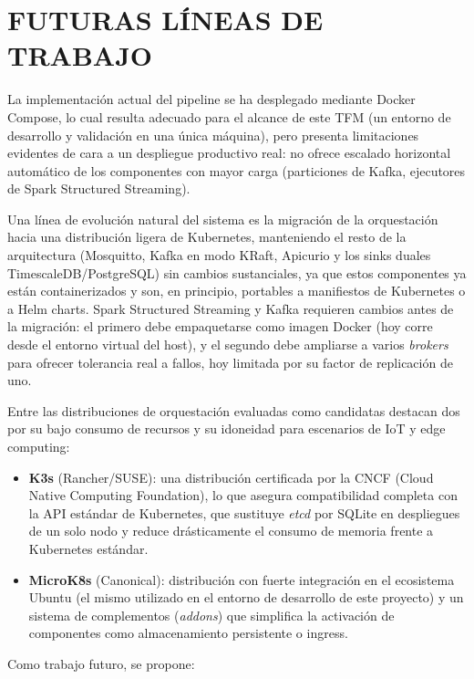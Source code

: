 \chapter{FUTURAS LÍNEAS DE TRABAJO}

La implementación actual del pipeline se ha desplegado mediante Docker Compose, lo cual resulta adecuado para el alcance de este TFM (un entorno de desarrollo y validación en una única máquina), pero presenta limitaciones evidentes de cara a un despliegue productivo real: no ofrece escalado horizontal automático de los componentes con mayor carga (particiones de Kafka, ejecutores de Spark Structured Streaming).

Una línea de evolución natural del sistema es la migración de la orquestación hacia una distribución ligera de Kubernetes, manteniendo el resto de la arquitectura (Mosquitto, Kafka en modo KRaft, Apicurio y los sinks duales TimescaleDB/PostgreSQL) sin cambios sustanciales, ya que estos componentes ya están containerizados y son, en principio, portables a manifiestos de Kubernetes o a Helm charts. Spark Structured Streaming y Kafka requieren cambios antes de la migración: el primero debe empaquetarse como imagen Docker (hoy corre desde el entorno virtual del host), y el segundo debe ampliarse a varios \textit{brokers} para ofrecer tolerancia real a fallos, hoy limitada por su factor de replicación de uno.

Entre las distribuciones de orquestación evaluadas como candidatas destacan dos por su bajo consumo de recursos y su idoneidad para escenarios de IoT y edge computing:

\begin{itemize}
    \item \textbf{K3s} (Rancher/SUSE): una distribución certificada por la CNCF (Cloud Native Computing Foundation), lo que asegura compatibilidad completa con la API estándar de Kubernetes, que sustituye \textit{etcd} por SQLite en despliegues de un solo nodo y reduce drásticamente el consumo de memoria frente a Kubernetes estándar.
    \item \textbf{MicroK8s} (Canonical): distribución con fuerte integración en el ecosistema Ubuntu (el mismo utilizado en el entorno de desarrollo de este proyecto) y un sistema de complementos (\textit{addons}) que simplifica la activación de componentes como almacenamiento persistente o ingress.
\end{itemize}

Como trabajo futuro, se propone:

